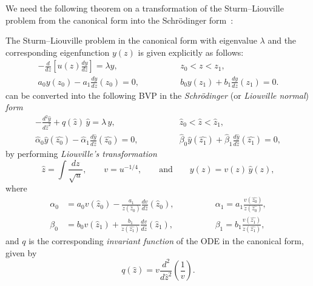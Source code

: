 \documentclass[symmetry,article,accept,moreauthors,pdftex,a4paper]{mdpi}
\begin{document}
\begin{paracol}{2}
We need the following theorem on a transformation of the Sturm--Liouville problem from the canonical form into the Schr\"odinger form~\cite{pryce1993numerical}:
\begin{Theorem}
The Sturm--Liouville problem in the canonical form with eigenvalue $\lambda$ and the corresponding eigenfunction $y(z)$ is given explicitly as follows:
\begin{align*}
-\frac{d}{dz} \left[u(z) \frac{dy}{dz} \right] = \lambda y,& \qquad \qquad z_0 < z < z_1, \\
a_0 y(z_0) - a_1 \frac{dy}{dz}(z_0) = 0,& \qquad \qquad b_0 y(z_1) + b_1 \frac{dy}{dz}(z_1) = 0.
\end{align*}
can be converted into the following BVP in the \emph{Schr\"odinger} (or \emph{Liouville normal}) \emph{form}
\begin{align*}
-\frac{d^2\widehat{y}}{d\widehat{z}^2} + q(\widehat{z}) \, \widehat{y} = \lambda \, \widehat{y},& \qquad \qquad \widehat{z}_0 < \widehat{z} < \widehat{z}_1,		\\%
\widehat{\alpha}_0 \widehat{y}(\widehat{z_0}) - \widehat{\alpha}_1 \frac{d\widehat{y}}{d\widehat{z}}(\widehat{z_0}) = 0, & \qquad \qquad 
\widehat{ \beta}_0 \widehat{y}(\widehat{z_1}) + \widehat{ \beta}_1 \frac{d\widehat{y}}{d\widehat{z}}(\widehat{z_1}) = 0,	%
\end{align*}
by performing \emph{Liouville's transformation}
\begin{equation}
\widehat{z} = \int \frac{dz}{\sqrt{u}}, \qquad v = u^{-1/4}, \qquad \text{and} \qquad y(z) = v(z) \, \widehat{y}(z),		\label{liou-trans}
\end{equation}
where
\begin{align*}
\alpha_0 &= a_0 v(\widehat{z}_0) - \frac{a_1}{\dot{z}(\widehat{z}_0)} \frac{dv}{d\widehat{z}}(\widehat{z}_0), \qquad \qquad 
&\alpha_1 = a_1 \frac{v(\widehat{z_0})}{\dot{z}(\widehat{z_0})}, \\
\beta_0 &= b_0 v(\widehat{z}_1) + \frac{b_1}{\dot{z}(\widehat{z_1})} \frac{dv}{d\widehat{z}}(\widehat{z}_1), \qquad \qquad 
&\beta_1 = b_1 \frac{v(\widehat{z_1})}{\dot{z}(\widehat{z_1})},
\end{align*}
and $q$ is the corresponding \emph{invariant function} of the ODE in the canonical form, given by
\begin{equation*}
q(\widehat{z}) = v \frac{d^2}{d\widehat{z}^2} \left(\frac{1}{v}\right).
\end{equation*}
\end{Theorem}


\end{paracol}
\end{document}
